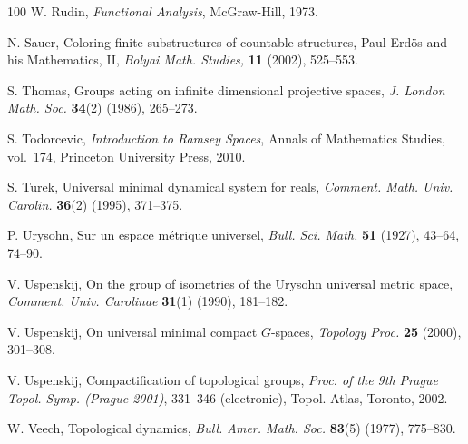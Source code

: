 \begin{thebibliography}{100}
W. Rudin, {\it Functional Analysis}, McGraw-Hill, 1973.

N. Sauer, Coloring finite substructures of countable structures,
Paul Erd\"{o}s and his Mathematics, II, {\it Bolyai Math. Studies,} {\bf 11}
(2002), 525--553.

S. Thomas, Groups acting on infinite dimensional projective spaces,
{\it J. London Math. Soc.} {\bf 34}(2) (1986), 265--273.

S. Todorcevic, {\it Introduction to Ramsey Spaces}, Annals of Mathematics
Studies, vol.~174, Princeton University Press, 2010.

S. Turek, Universal minimal dynamical system for reals, {\it Comment.
Math. Univ. Carolin.} {\bf 36}(2) (1995), 371--375.

P. Urysohn, Sur un espace m\'etrique universel, {\it Bull. Sci.
Math.} {\bf 51} (1927), 43--64, 74--90.

V. Uspenskij, On the group of isometries of the Urysohn universal
metric space, {\it Comment. Univ. Carolinae} {\bf 31}(1) (1990), 181--182.

V. Uspenskij, On universal minimal compact \(G\)-spaces, {\it Topology
Proc.} {\bf 25} (2000), 301--308.

V. Uspenskij, Compactification of topological groups, {\it Proc. of the 9th
Prague Topol. Symp. (Prague 2001)}, 331--346 (electronic), Topol. Atlas,
Toronto, 2002.

W. Veech, Topological dynamics, {\it Bull. Amer. Math. Soc.}
{\bf 83}(5) (1977), 775--830.

\end{thebibliography}
